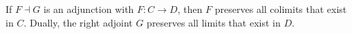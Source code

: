If $F \dashv G$ is an adjunction with $F: C \rightarrow D$, then $F$ preserves all colimits that exist in $C$. Dually, the right adjoint $G$ preserves all limits that exist in $D$.